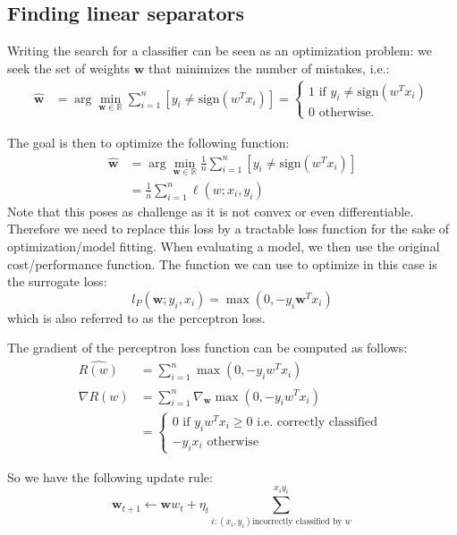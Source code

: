\documentclass[a4paper,10pt,twoside]{article}
\begin{document}
\subsection{Finding linear separators}

Writing the search for a classifier can be seen as an optimization problem:
we seek the set of weights $\mathbf{w}$ that minimizes the number of mistakes, i.e.:
\begin{align*}
    \hat{\mathbf{w}} &= \arg\min_{\mathbf{w}\in\mathbb{R}}\sum_{i=1}^{n}[y_i\neq \text{sign}(w^Tx_i)]
    =\begin{cases}
        1\text{ if } y_i\neq \text{sign}(w^Tx_i)\\
        0\text{ otherwise.}
    \end{cases}
\end{align*}

The goal is then to optimize the following function:
\begin{align*}
    \hat{\mathbf{w}} &= \arg\min_{\mathbf{w}\in\mathbb{R}}\frac{1}{n}\sum_{i=1}^{n}[y_i\neq \text{sign}(w^T x_i)]\\
    &= \frac{1}{n}\sum_{i=1}^{n}\ell(w; x_i,y_i)
\end{align*}
Note that this poses as challenge as it is not convex or even differentiable. Therefore we need to replace this loss by a tractable loss function for the sake of optimization/model fitting. When evaluating a model, we then use the original cost/performance function. The function we can use to optimize in this case is the surrogate loss:
\begin{equation*}
    l_P(\mathbf{w}; y_i, x_i) = \max (0, -y_i\mathbf{w}^Tx_i)
\end{equation*}
which is also referred to as the perceptron loss.

The gradient of the perceptron loss function can be computed as follows:
\begin{align*}
    \hat{R(w)}&=\sum_{i=1}^{n}\max (0, -y_iw^Tx_i)\\
    \nabla\hat{R(w)}&=\sum_{i=1}^{n}\nabla_{\mathbf{w}}\max (0, -y_iw^Tx_i)\\
    &=\begin{cases}
        0\text{ if } y_iw^Tx_i\geq 0 \text{ i.e. correctly classified }\\
        -y_ix_i\text{ otherwise}
    \end{cases}
\end{align*}

So we have the following update rule:
\begin{equation*}
    \mathbf{w}_{t+1} \leftarrow \mathbf{w}w_t+\eta_t\sum_{i:(x_i,y_i) \text{incorrectly classified by } w}^{x_iy_i}
\end{equation*}
\end{document}
